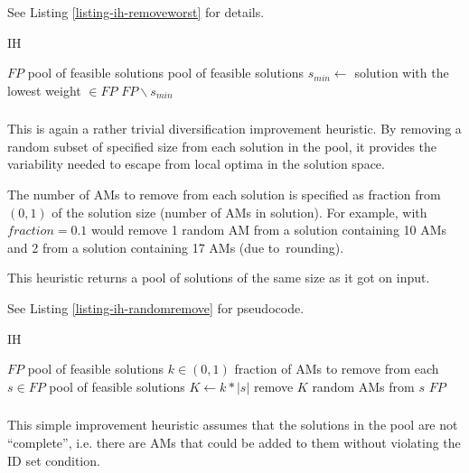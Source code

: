 See Listing \ref{listing-ih-removeworst} for details.

\begin{algorithm}
\caption{ IH}
\label{listing-ih-removeworst}
\begin{algorithmic}
\REQUIRE $FP$ pool of feasible solutions
\ENSURE pool of feasible solutions
\STATE $s_{min} \gets $ solution with the lowest weight $\in FP$
\RETURN $FP \backslash s_{min}$
\end{algorithmic}
\end{algorithm}

\subsubsection{}

This is again a rather trivial diversification improvement heuristic. By removing a random subset of specified size from each solution in the pool, it provides the variability needed to escape from local optima in the solution space.

The number of AMs to remove from each solution is specified as fraction from $(0, 1)$ of the solution size (number of AMs in solution). For example,  with $fraction = 0.1$ would remove 1 random AM from a solution containing 10 AMs and 2 from a solution containing 17 AMs (due to~rounding).

This heuristic returns a pool of solutions of the same size as it got on input.

See Listing \ref{listing-ih-randomremove} for pseudocode.

\begin{algorithm}
\caption{ IH}
\label{listing-ih-randomremove}
\begin{algorithmic}
\REQUIRE $FP$ pool of feasible solutions
\REQUIRE $k \in (0,1)$ fraction of AMs to remove from each $s \in FP$
\ENSURE pool of feasible solutions
  \STATE $K \gets k * |s|$
  \STATE remove $K$ random AMs from $s$
\ENDFOR
\RETURN $FP$
\end{algorithmic}
\end{algorithm}

\subsubsection{}

This simple improvement heuristic assumes that the solutions in the pool are not ``complete'', i.e. there are AMs that could be added to them without violating the ID set condition.

